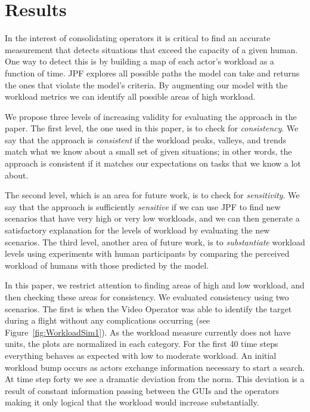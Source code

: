 \section{Results}
In the interest of consolidating operators it is critical to find an accurate measurement that detects situations that exceed the capacity of a given human. One way to detect this is by building a map of each actor's workload as a function of time. JPF explores all possible paths the model can take and returns the ones that violate the model's criteria. By augmenting our model with the workload metrics we can identify all possible areas of high workload. 

We propose three levels of increasing validity for evaluating the approach in the paper.  The first level, the one used in this paper, is to check for {\em consistency}.  We say that the approach is {\em consistent} if the workload peaks, valleys, and trends match what we know about a small set of given situations; in other words, the approach is consistent if it matches our expectations on tasks that we know a lot about.  

The second level, which is an area for future work, is to check for {\em sensitivity}.  We say that  the approach is sufficiently {\em sensitive} if we can use JPF to find new scenarios that have very high or very low workloads, and we can then generate a satisfactory explanation for the levels of workload by evaluating the new scenarios.  The third level, another area of future work, is to {\em substantiate} workload levels using experiments with human participants by comparing the perceived workload of humans with those predicted by the model.

In this paper, we restrict attention to finding areas of high and low workload, and then checking these areas for consistency.  We evaluated consistency using two scenarios.  The first is when the Video Operator was able to identify the target during a flight without any complications occurring (see Figure~\ref{fig:WorkloadSim1}). As the workload measure currently does not have units, the plots are normalized in each category. For the first 40 time steps everything behaves as expected with low to moderate workload. An initial workload bump occurs as actors exchange information necessary to start a search.   At time step forty we see a dramatic deviation from the norm. This deviation is a result of constant information passing between the GUIs and the operators
making it only
 logical that the workload would increase substantially.

